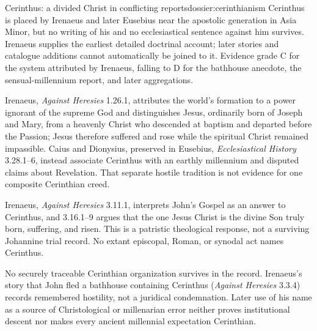\begin{heresydossier}{Cerinthus: a divided Christ in conflicting reports}{dossier:cerinthianism}
\objectfield Cerinthus is placed by Irenaeus and later Eusebius near the apostolic generation in Asia Minor, but no writing of his and no ecclesiastical sentence against him survives. Irenaeus supplies the earliest detailed doctrinal account; later stories and catalogue additions cannot automatically be joined to it. Evidence grade C for the system attributed by Irenaeus, falling to D for the bathhouse anecdote, the sensual-millennium report, and later aggregations.

\propositionfield Irenaeus, \emph{Against Heresies} 1.26.1, attributes the world's formation to a power ignorant of the supreme God and distinguishes Jesus, ordinarily born of Joseph and Mary, from a heavenly Christ who descended at baptism and departed before the Passion; Jesus therefore suffered and rose while the spiritual Christ remained impassible. Caius and Dionysius, preserved in Eusebius, \emph{Ecclesiastical History} 3.28.1--6, instead associate Cerinthus with an earthly millennium and disputed claims about Revelation. That separate hostile tradition is not evidence for one composite Cerinthian creed.

\responsefield Irenaeus, \emph{Against Heresies} 3.11.1, interprets John's Gospel as an answer to Cerinthus, and 3.16.1--9 argues that the one Jesus Christ is the divine Son truly born, suffering, and risen. This is a patristic theological response, not a surviving Johannine trial record. No extant episcopal, Roman, or synodal act names Cerinthus.

\aftermathfield No securely traceable Cerinthian organization survives in the record. Irenaeus's story that John fled a bathhouse containing Cerinthus (\emph{Against Heresies} 3.3.4) records remembered hostility, not a juridical condemnation. Later use of his name as a source of Christological or millenarian error neither proves institutional descent nor makes every ancient millennial expectation Cerinthian.
\end{heresydossier}

